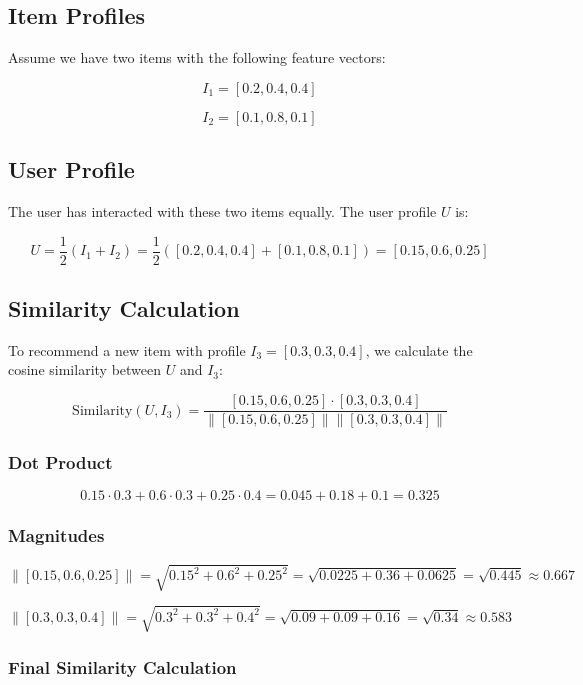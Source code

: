 \documentclass[12pt, a4paper, oneside]{article}
\begin{document}
\subsection*{Item Profiles}

Assume we have two items with the following feature vectors:

\[
I_1 = [0.2, 0.4, 0.4]
\]

\[
I_2 = [0.1, 0.8, 0.1]
\]

\subsection*{User Profile}

The user has interacted with these two items equally. The user profile \( U \) is:

\[
U = \frac{1}{2} \left(I_1 + I_2\right) = \frac{1}{2} \left([0.2, 0.4, 0.4] + [0.1, 0.8, 0.1]\right) = [0.15, 0.6, 0.25]
\]

\subsection*{Similarity Calculation}

To recommend a new item with profile \( I_3 = [0.3, 0.3, 0.4] \), we calculate the cosine similarity between \( U \) and \( I_3 \):

\[
\text{Similarity}(U, I_3) = \frac{[0.15, 0.6, 0.25] \cdot [0.3, 0.3, 0.4]}{\|[0.15, 0.6, 0.25]\| \|[0.3, 0.3, 0.4]\|}
\]

\subsubsection*{Dot Product}

\[
0.15 \cdot 0.3 + 0.6 \cdot 0.3 + 0.25 \cdot 0.4 = 0.045 + 0.18 + 0.1 = 0.325
\]

\subsubsection*{Magnitudes}

\[
\|[0.15, 0.6, 0.25]\| = \sqrt{0.15^2 + 0.6^2 + 0.25^2} = \sqrt{0.0225 + 0.36 + 0.0625} = \sqrt{0.445} \approx 0.667
\]

\[
\|[0.3, 0.3, 0.4]\| = \sqrt{0.3^2 + 0.3^2 + 0.4^2} = \sqrt{0.09 + 0.09 + 0.16} = \sqrt{0.34} \approx 0.583
\]

\subsubsection*{Final Similarity Calculation}
\end{document}
